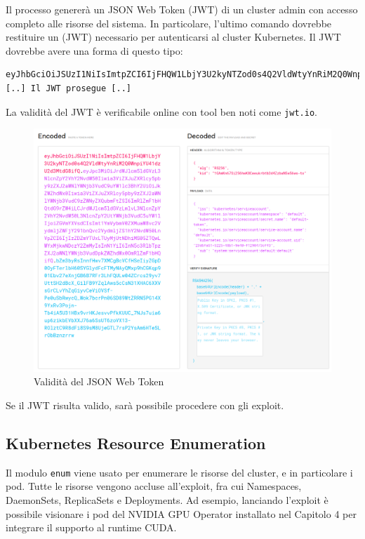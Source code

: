 Il processo genererà un JSON Web Token (JWT) di un cluster admin con accesso completo alle risorse del sistema. In particolare, l'ultimo comando dovrebbe restituire un (JWT) necessario per autenticarsi al cluster Kubernetes. Il JWT dovrebbe avere una forma di questo tipo:

\begin{code}
\label{code:apx:a:dockerfile}
\begin{verbatim}
eyJhbGciOiJSUzI1NiIsImtpZCI6IjFHQW1LbjY3U2kyNTZod0s4Q2VldWtyYnRiM2Q0Wnpi
[..] Il JWT prosegue [..]
\end{verbatim}
\end{code}

La validità del JWT è verificabile online con tool ben noti come {\small \verb|jwt.io|}.

\begin{figure}[H]
    \centering
    \includegraphics[width=\linewidth]{figures/ch4and5/jwt.png}
    \caption[Validità del JSON Web Token]{Validità del JSON Web Token}
    \label{fig:cha6:jwt}
\end{figure}

Se il JWT risulta valido, sarà possibile procedere con gli exploit.

\subsection{Kubernetes Resource Enumeration}

Il modulo {\small \verb|enum|} viene usato per enumerare le risorse del cluster, e in particolare i pod. Tutte le risorse vengono accluse all'exploit, fra cui Namespaces, DaemonSets, ReplicaSets e Deployments. Ad esempio, lanciando l'exploit è possibile visionare i pod del NVIDIA GPU Operator installato nel Capitolo 4 per integrare il supporto al runtime CUDA.

